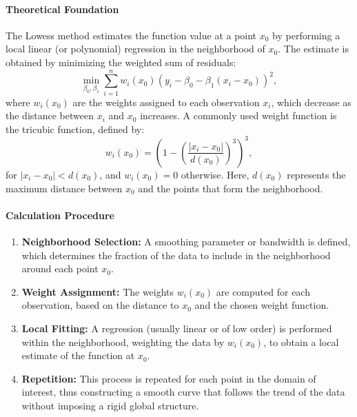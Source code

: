 \documentclass[10pt]{article}
\begin{document}
\paragraph{Theoretical Foundation}  
The Lowess method estimates the function value at a point \(x_0\) by performing a local linear (or polynomial) regression in the neighborhood of \(x_0\). The estimate is obtained by minimizing the weighted sum of residuals:
\[
\min_{\beta_0, \beta_1} \sum_{i=1}^{n} w_i(x_0) \left(y_i - \beta_0 - \beta_1 (x_i - x_0)\right)^2,
\]
where \(w_i(x_0)\) are the weights assigned to each observation \(x_i\), which decrease as the distance between \(x_i\) and \(x_0\) increases. A commonly used weight function is the tricubic function, defined by:
\[
w_i(x_0) = \left(1 - \left(\frac{|x_i - x_0|}{d(x_0)}\right)^3\right)^3,
\]
for \(|x_i - x_0| < d(x_0)\), and \(w_i(x_0)=0\) otherwise. Here, \(d(x_0)\) represents the maximum distance between \(x_0\) and the points that form the neighborhood.

\paragraph{Calculation Procedure}  
\begin{enumerate}
    \item \textbf{Neighborhood Selection:} A smoothing parameter or bandwidth is defined, which determines the fraction of the data to include in the neighborhood around each point \(x_0\).
    \item \textbf{Weight Assignment:} The weights \(w_i(x_0)\) are computed for each observation, based on the distance to \(x_0\) and the chosen weight function.
    \item \textbf{Local Fitting:} A regression (usually linear or of low order) is performed within the neighborhood, weighting the data by \(w_i(x_0)\), to obtain a local estimate of the function at \(x_0\).
    \item \textbf{Repetition:} This process is repeated for each point in the domain of interest, thus constructing a smooth curve that follows the trend of the data without imposing a rigid global structure.
\end{enumerate}
\end{document}
